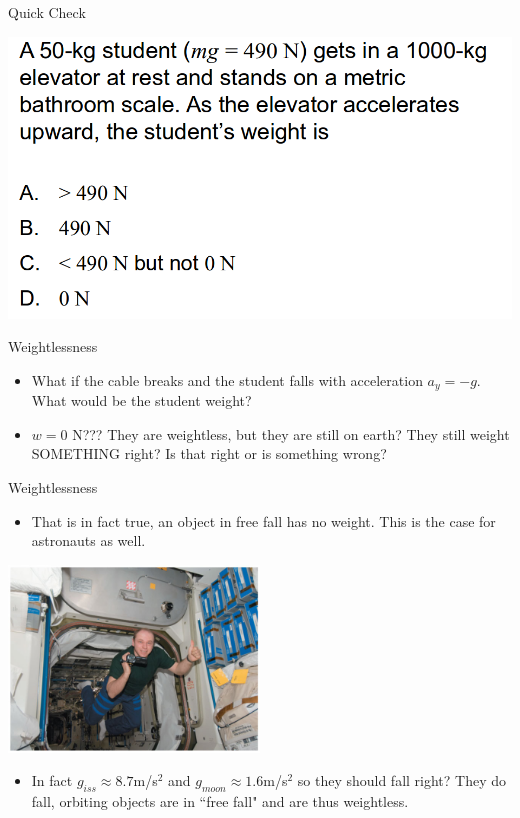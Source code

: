 \documentclass{beamer}
\newcommand{\red}[1]{{\color{red}{#1}}}
\newcommand{\checkL}[2]{\begin{textblock*}{1cm}(#1,#2){\Large \red{\Checkmark}}\end{textblock*}}
\begin{document}
\begin{frame}{Quick Check}
\begin{center}
   \includegraphics[width=\textwidth]{../figures/QC6_9.png}
\end{center}
\only<2>{\checkL{0.9cm}{4.7cm}}
\end{frame}

\begin{frame}{Weightlessness}
\begin{itemize}
   \item What if the cable breaks and the student falls with acceleration $a_y=-g$. What would be the student weight?
   \item<2-> $w=0$ N??? They are weightless, but they are still on earth? They still weight SOMETHING right? Is that right or is something wrong?
\end{itemize}
\end{frame}

\begin{frame}{Weightlessness}
\begin{itemize}
   \item That is in fact true, an object in free fall has no weight. This is the case for astronauts as well.
\end{itemize}
\begin{center}
   \includegraphics[width=0.5\textwidth]{../figures/06_Pg140_UnFigure.jpg}
\end{center}
\begin{itemize}
   \item In fact $g_{iss} \approx 8.7$m/s$^2$ and $g_{moon} \approx 1.6$m/s$^2$ so they should fall right? They do fall, orbiting objects are in ``free fall" and are thus weightless.
\end{itemize}
\end{frame}
\end{document}
